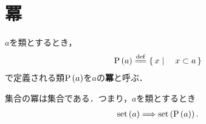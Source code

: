 \section{冪}
	\begin{screen}
		\begin{dfn}[冪]
			$a$を類とするとき，
			\begin{align}
				\power{a} \defeq \Set{x}{x \subset a}
			\end{align}
			で定義される類$\operatorname*{P} \left(a\right)$を$a$の{\bf 冪}と呼ぶ．
		\end{dfn}
	\end{screen}
	
	\begin{screen}
		\begin{axm}[冪の公理]
			集合の冪は集合である．つまり，$a$を類とするとき
			\begin{align}
				\operatorname*{set} \left(a\right) \Longrightarrow \operatorname*{set} \left(\operatorname*{P} \left(a\right)\right).
			\end{align}
		\end{axm}
	\end{screen}